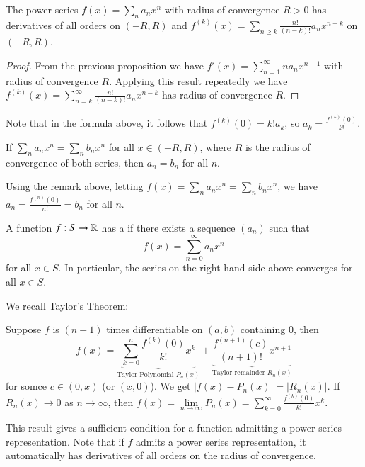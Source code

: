\begin{cor}
    The power series $f(x) = \sum_na_nx^n$ with radius of convergence $R > 0$ has derivatives of all orders on $(-R,R)$ and $f^{(k)}(x) = \sum_{n\geq k}\frac{n!}{(n-k)!}a_nx^{n-k}$ on $(-R,R)$.
\end{cor}
\begin{proof}
    From the previous proposition we have $f'(x) = \sum_{n=1}^{\infty}na_nx^{n-1}$ with radius of convergence $R$. Applying this result repeatedly we have $f^{(k)}(x) = \sum_{n=k}^{\infty}\frac{n!}{(n-k)!}a_nx^{n-k}$ has radius of convergence $R$.
\end{proof}

Note that in the formula above, it follows that $f^{(k)}(0) = k!a_k$, so $a_k = \frac{f^{(k)}(0)}{k!}$.

\begin{cor}
    If $\sum_na_nx^n = \sum_nb_nx^n$ for all $x \in (-R,R)$, where $R$ is the radius of convergence of both series, then $a_n = b_n$ for all $n$.
\end{cor}
Using the remark above, letting $f(x) = \sum_na_nx^n = \sum_nb_nx^n$, we have $a_n = \frac{f^{(n)}(0)}{n!} = b_n$ for all $n$.

\begin{defn}
    A function $f:S\rightarrow \mathbb R$ has a  if there exists a sequence $(a_n)$ such that $$f(x) = \sum_{n=0}^{\infty}a_nx^n$$ for all $x \in S$. In particular, the series on the right hand side above converges for all $x \in S$.
\end{defn}

We recall Taylor's Theorem:

\begin{thm}
    Suppose $f$ is $(n+1)$ times differentiable on $(a,b)$ containing $0$, then $$f(x) = \underbrace{\sum_{k=0}^n\frac{f^{(k)}(0)}{k!}x^k}_{\text{Taylor Polynomial } P_n(x)} + \underbrace{\frac{f^{(n+1)}(c)}{(n+1)!}x^{n+1}}_{\text{Taylor remainder }R_n(x)}$$ for somce $c \in (0,x)$ (or $(x,0)$). We get $|f(x) - P_n(x)| = |R_n(x)|$. If $R_n(x)\rightarrow 0$ as $n\rightarrow \infty$, then $f(x) = \lim\limits_{n\rightarrow \infty}P_n(x) = \sum_{k=0}^{\infty}\frac{f^{(k)}(0)}{k!}x^k$.
\end{thm}

This result gives a sufficient condition for a function admitting a power series representation. Note that if $f$ admits a power series representation, it automatically has derivatives of all orders on the radius of convergence.

